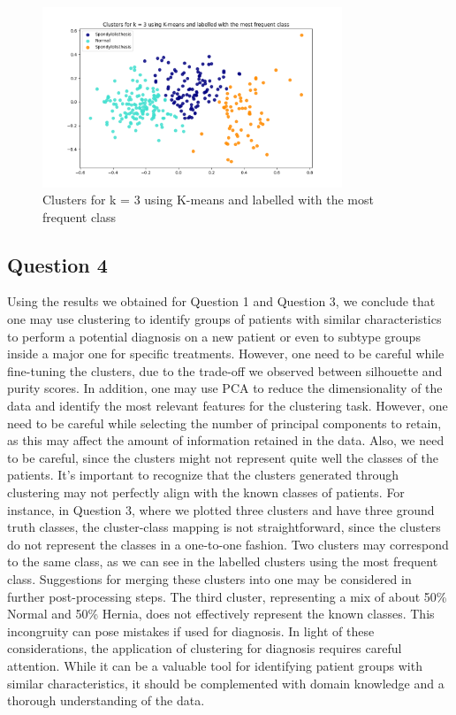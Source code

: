 \documentclass{article}
\begin{document}
\begin{figure}[H]
  \centering
  \includegraphics[width=0.8\textwidth]{images/clusters_frequency.png}
  \caption{Clusters for k = 3 using K-means and labelled with the most frequent class}
  \label{fig:clusters_frequency}
\end{figure}

\subsection*{Question 4}

Using the results we obtained for Question 1 and Question 3, we conclude that one may use clustering to identify groups of patients with similar characteristics to perform a potential diagnosis on a new patient or even to subtype groups inside a major one for specific treatments. However, one need to be careful while fine-tuning the clusters, due to the trade-off we observed between silhouette and purity scores.
In addition, one may use PCA to reduce the dimensionality of the data and identify the most relevant features for the clustering task.
However, one need to be careful while selecting the number of principal components to retain, as this may affect the amount of information retained in the data. Also, we need to be careful, since the clusters might not represent quite well the classes of the patients.
It's important to recognize that the clusters generated through clustering may not perfectly align with the known classes of patients.
For instance, in Question 3, where we plotted three clusters and have three ground truth classes, the cluster-class mapping is not straightforward, since the clusters do not represent the classes in a one-to-one fashion.
Two clusters may correspond to the same class, as we can see in the labelled clusters using the most frequent class. Suggestions for merging these clusters into one may be considered in further post-processing steps.
The third cluster, representing a mix of about 50\% Normal and 50\% Hernia, does not effectively represent the known classes. This incongruity can pose mistakes if used for diagnosis.
In light of these considerations, the application of clustering for diagnosis requires careful attention. While it can be a valuable tool for identifying patient groups with similar characteristics, it should be complemented with domain knowledge and a thorough understanding of the data.
\end{document}

